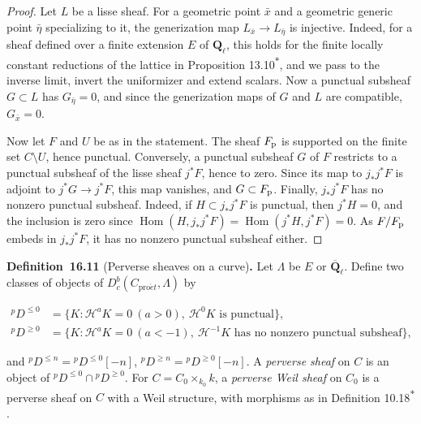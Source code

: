 \documentclass[11pt]{article}
\newenvironment{bpstatement}[2]{\par\addvspace{0.6\baselineskip}\noindent\textbf{#1}#2\textbf{.}\enspace\ignorespaces}
  {\par\addvspace{0.4\baselineskip}}
\newcommand{\bpout}[1]{#1\textsuperscript{\hyperlink{bp-outside}{\ensuremath{\ast}}}}
\providecommand{\Hom}{}\renewcommand{\Hom}{\operatorname{Hom}}
\begin{document}
\begin{proof}[{Proof}]\label{bp34}%
Let \(L\) be a lisse sheaf. For a geometric point \(\bar x\) and a geometric generic point \(\bar\eta\) specializing to it, the generization map \(L_{\bar x}\to L_{\bar\eta}\) is injective. Indeed, for a sheaf defined over a finite extension \(E\) of \(\mathbf Q_\ell\), this holds for the finite locally constant reductions of the lattice in Proposition \bpout{13.10}, and we pass to the inverse limit, invert the uniformizer and extend scalars. Now a punctual subsheaf \(G\subset L\) has \(G_{\bar\eta}=0\), and since the generization maps of \(G\) and \(L\) are compatible, \(G_{\bar x}=0\).

Now let \(F\) and \(U\) be as in the statement. The sheaf \(F_{\rm p}\) is supported on the finite set \(C\setminus U\), hence punctual. Conversely, a punctual subsheaf \(G\) of \(F\) restricts to a punctual subsheaf of the lisse sheaf \(j^*F\), hence to zero. Since its map to \(j_*j^*F\) is adjoint to \(j^*G\to j^*F\), this map vanishes, and \(G\subset F_{\rm p}\). Finally, \(j_*j^*F\) has no nonzero punctual subsheaf. Indeed, if \(H\subset j_*j^*F\) is punctual, then \(j^*H=0\), and the inclusion is zero since \(\Hom(H,j_*j^*F)=\Hom(j^*H,j^*F)=0\). As \(F/F_{\rm p}\) embeds in \(j_*j^*F\), it has no nonzero punctual subsheaf either.
\end{proof}

\label{bp35}%
\begin{bpstatement}{Definition~16.11}{ (Perverse sheaves on a curve)}
Let \(\Lambda\) be \(E\) or \(\overline{\mathbf Q}_\ell\). Define two classes of objects of \(D^b_c(C_{\mathrm{pro}\acute{e}t},\Lambda)\) by

\[
\begin{split}
{}^pD^{\le0}&=\{K:\mathcal H^aK=0\ (a>0),\
\mathcal H^0K\text{ is punctual}\},\\
{}^pD^{\ge0}&=\{K:\mathcal H^aK=0\ (a<-1),\
\mathcal H^{-1}K\text{ has no nonzero punctual subsheaf}\},
\end{split}
\]

and \({}^pD^{\le n}={}^pD^{\le0}[-n]\), \({}^pD^{\ge n}={}^pD^{\ge0}[-n]\). A \emph{perverse sheaf} on \(C\) is an object of \({}^pD^{\le0}\cap{}^pD^{\ge0}\). For \(C=C_0\times_{k_0}k\), a \emph{perverse Weil sheaf} on \(C_0\) is a perverse sheaf on \(C\) with a Weil structure, with morphisms as in Definition \bpout{10.18}.
\end{bpstatement}
\end{document}
